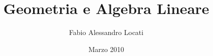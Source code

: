 \documentclass[11pt,a4paper]{book}
\begin{document}
\author{Fabio Alessandro Locati}
\title{Geometria e Algebra Lineare}
\date{Marzo 2010}

\frontmatter
\maketitle
\tableofcontents


\mainmatter


\backmatter
\printindex
\end{document}
